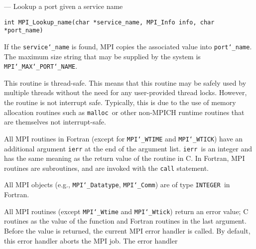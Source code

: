 \startmanpage
{}
--- Lookup a port given a service name 
\startvb\begin{verbatim}
int MPI_Lookup_name(char *service_name, MPI_Info info, char *port_name)

\end{verbatim}
\endvb

\par
\par
{}
\par
{}
If the {\tt service{\tt \char`\_}name} is found, MPI copies the associated value into
{\tt port{\tt \char`\_}name}.  The maximum size string that may be supplied by the system is
{\tt MPI{\tt \char`\_}MAX{\tt \char`\_}PORT{\tt \char`\_}NAME}.
\par
{}
\par
This routine is thread-safe.  This means that this routine may be
safely used by multiple threads without the need for any user-provided
thread locks.  However, the routine is not interrupt safe.  Typically,
this is due to the use of memory allocation routines such as {\tt malloc
}or other non-MPICH runtime routines that are themselves not interrupt-safe.
\par
{}
All MPI routines in Fortran (except for {\tt MPI{\tt \char`\_}WTIME} and {\tt MPI{\tt \char`\_}WTICK}) have
an additional argument {\tt ierr} at the end of the argument list.  {\tt ierr
}is an integer and has the same meaning as the return value of the routine
in C.  In Fortran, MPI routines are subroutines, and are invoked with the
{\tt call} statement.
\par
All MPI objects (e.g., {\tt MPI{\tt \char`\_}Datatype}, {\tt MPI{\tt \char`\_}Comm}) are of type {\tt INTEGER
}in Fortran.
\par
{}
\par
All MPI routines (except {\tt MPI{\tt \char`\_}Wtime} and {\tt MPI{\tt \char`\_}Wtick}) return an error value;
C routines as the value of the function and Fortran routines in the last
argument.  Before the value is returned, the current MPI error handler is
called.  By default, this error handler aborts the MPI job.  The error handler
